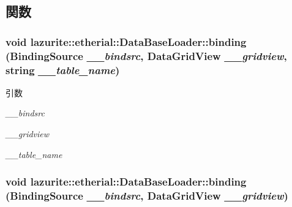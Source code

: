 \subsection{関数}
\hypertarget{classlazurite_1_1etherial_1_1_data_base_loader_ab776f005f4e3a8815485b4bbb48ccc88}{
\subsubsection[{binding}]{\setlength{\rightskip}{0pt plus 5cm}void lazurite::etherial::DataBaseLoader::binding (BindingSource {\em \_\-\_\-bindsrc}, \/  DataGridView {\em \_\-\_\-gridview}, \/  string {\em \_\-\_\-table\_\-name})}}
\label{classlazurite_1_1etherial_1_1_data_base_loader_ab776f005f4e3a8815485b4bbb48ccc88}

\begin{DoxyParams}{引数}
\item[{\em \_\-\_\-bindsrc}]\item[{\em \_\-\_\-gridview}]\item[{\em \_\-\_\-table\_\-name}]\end{DoxyParams}
\hypertarget{classlazurite_1_1etherial_1_1_data_base_loader_ab727726afae6a0b2a05651462231fb42}{
\subsubsection[{binding}]{\setlength{\rightskip}{0pt plus 5cm}void lazurite::etherial::DataBaseLoader::binding (BindingSource {\em \_\-\_\-bindsrc}, \/  DataGridView {\em \_\-\_\-gridview})}}
\label{classlazurite_1_1etherial_1_1_data_base_loader_ab727726afae6a0b2a05651462231fb42}


